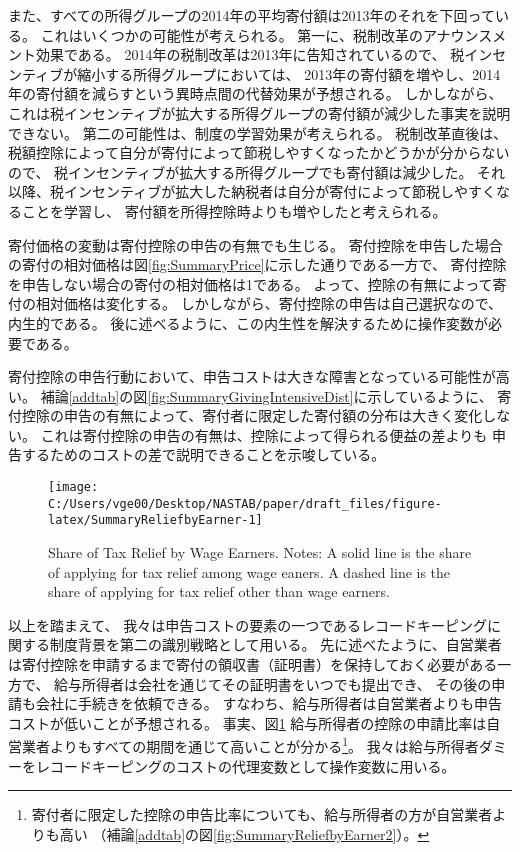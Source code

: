 \documentclass[
  11pt,
  a4paper,
]{article}
\begin{document}
また、すべての所得グループの2014年の平均寄付額は2013年のそれを下回っている。
これはいくつかの可能性が考えられる。
第一に、税制改革のアナウンスメント効果である。
2014年の税制改革は2013年に告知されているので、
税インセンティブが縮小する所得グループにおいては、
2013年の寄付額を増やし、2014年の寄付額を減らすという異時点間の代替効果が予想される。
しかしながら、これは税インセンティブが拡大する所得グループの寄付額が減少した事実を説明できない。
第二の可能性は、制度の学習効果が考えられる。
税制改革直後は、税額控除によって自分が寄付によって節税しやすくなったかどうかが分からないので、
税インセンティブが拡大する所得グループでも寄付額は減少した。
それ以降、税インセンティブが拡大した納税者は自分が寄付によって節税しやすくなることを学習し、
寄付額を所得控除時よりも増やしたと考えられる。

寄付価格の変動は寄付控除の申告の有無でも生じる。
寄付控除を申告した場合の寄付の相対価格は図\ref{fig:SummaryPrice}に示した通りである一方で、
寄付控除を申告しない場合の寄付の相対価格は1である。
よって、控除の有無によって寄付の相対価格は変化する。
しかしながら、寄付控除の申告は自己選択なので、内生的である。
後に述べるように、この内生性を解決するために操作変数が必要である。

寄付控除の申告行動において、申告コストは大きな障害となっている可能性が高い。
補論\ref{addtab}の図\ref{fig:SummaryGivingIntensiveDist}に示しているように、
寄付控除の申告の有無によって、寄付者に限定した寄付額の分布は大きく変化しない。
これは寄付控除の申告の有無は、控除によって得られる便益の差よりも
申告するためのコストの差で説明できることを示唆している。

\begin{figure}[t]

{\centering \texttt{[image: C:/Users/vge00/Desktop/NASTAB/paper/draft\_files/figure-latex/SummaryReliefbyEarner-1]} 

}

\caption{Share of Tax Relief by Wage Earners. Notes: A solid line is the share of applying for tax relief among wage eaners. A dashed line is the share of applying for tax relief other than wage earners.}\label{fig:SummaryReliefbyEarner}
\end{figure}

以上を踏まえて、
我々は申告コストの要素の一つであるレコードキーピングに関する制度背景を第二の識別戦略として用いる。
先に述べたように、自営業者は寄付控除を申請するまで寄付の領収書（証明書）を保持しておく必要がある一方で、
給与所得者は会社を通じてその証明書をいつでも提出でき、
その後の申請も会社に手続きを依頼できる。
すなわち、給与所得者は自営業者よりも申告コストが低いことが予想される。
事実、図\ref{fig:SummaryReliefbyEarner}
給与所得者の控除の申請比率は自営業者よりもすべての期間を通じて高いことが分かる\footnote{寄付者に限定した控除の申告比率についても、給与所得者の方が自営業者よりも高い
  （補論\ref{addtab}の図\ref{fig:SummaryReliefbyEarner2}）。}。
我々は給与所得者ダミーをレコードキーピングのコストの代理変数として操作変数に用いる。
\end{document}

